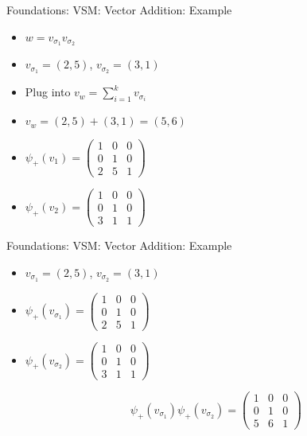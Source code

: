 \documentclass[12pt,a4paper]{beamer}
\begin{document}
\begin{frame}{Foundations: VSM: Vector Addition: Example}
\begin{itemize}
\item $w = v_{\sigma_{1}}v_{\sigma_{2}}$
\item $v_{\sigma_{1}} = (2,5)$, $v_{\sigma_{2}} = (3,1)$
\item Plug into $v_{w} = \sum_{i=1}^{k}v_{\sigma_{i}}$
\item $v_{w} = (2,5)+(3,1) = (5,6)$
\item $\psi_{+}(v_{1}) = \left( \begin{array}{cc|c}
1 & 0 & 0 \\
0 & 1 & 0 \\
2 & 5 & 1 \end{array} \right) $
\item  $\psi_{+}(v_{2}) = \left( \begin{array}{cc|c}
1 & 0 & 0 \\
0 & 1 & 0 \\
3 & 1 & 1 \end{array} \right) $
\end{itemize}
\end{frame}


\begin{frame}{Foundations: VSM: Vector Addition: Example}
\begin{itemize}
\item $v_{\sigma_{1}} = (2,5)$, $v_{\sigma_{2}} = (3,1)$
\item $\psi_{+}(v_{\sigma_{1}}) = \left( \begin{array}{cc|c}
1 & 0 & 0 \\
0 & 1 & 0 \\
2 & 5 & 1 \end{array} \right) $
\item  $\psi_{+}(v_{\sigma_{2}}) = \left( \begin{array}{cc|c}
1 & 0 & 0 \\
0 & 1 & 0 \\
3 & 1 & 1 \end{array} \right) $

$$ \psi_{+}(v_{\sigma_{1}}) \psi_{+}(v_{\sigma_{2}}) = 
\left( \begin{array}{cc|c}
1 & 0 & 0 \\
0 & 1 & 0 \\
5 & 6 & 1 \end{array} \right)
$$
\end{itemize}
\end{frame}
\end{document}
